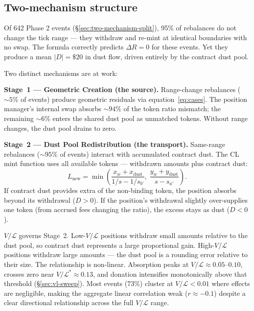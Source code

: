 \documentclass[11pt,a4paper]{article}
\begin{document}
\subsection{Two-mechanism structure}\label{sec:two-mechanism}

Of 642 Phase 2 events (\S\ref{sec:two-mechanism-split}), 95\% of rebalances do not change the tick range --- they withdraw and re-mint at identical boundaries with no swap. The formula correctly predicts $\Delta R = 0$ for these events. Yet they produce a mean $|D| = \$20$ in dust flow, driven entirely by the contract dust pool.

Two distinct mechanisms are at work:

\textbf{Stage~1 --- Geometric Creation (the source).} Range-change rebalances (${\sim}5\%$ of events) produce geometric residuals via equation~\eqref{eq:cases}. The position manager's internal swap absorbs ${\sim}94\%$ of the token ratio mismatch; the remaining ${\sim}6\%$ enters the shared dust pool as unmatched tokens. Without range changes, the dust pool drains to zero.

\textbf{Stage~2 --- Dust Pool Redistribution (the transport).} Same-range rebalances (${\sim}95\%$ of events) interact with accumulated contract dust. The CL mint function uses all available tokens --- withdrawn amounts plus contract dust:
\begin{equation}\label{eq:mint}
L_{\text{new}} = \min\!\left(\frac{x_w + x_{\text{dust}}}{1/s - 1/s_{b'}}, \; \frac{y_w + y_{\text{dust}}}{s - s_{a'}}\right).
\end{equation}
If contract dust provides extra of the non-binding token, the position absorbs beyond its withdrawal ($D > 0$). If the position's withdrawal slightly over-supplies one token (from accrued fees changing the ratio), the excess stays as dust ($D < 0$).

$V/\mathcal{L}$ governs Stage~2. Low-$V/\mathcal{L}$ positions withdraw small amounts relative to the dust pool, so contract dust represents a large proportional gain. High-$V/\mathcal{L}$ positions withdraw large amounts --- the dust pool is a rounding error relative to their size. The relationship is non-linear. Absorption peaks at $V/\mathcal{L} \approx 0.05$--$0.10$, crosses zero near $V/\mathcal{L}^* \approx 0.13$, and donation intensifies monotonically above that threshold (\S\ref{sec:vl-sweep}). Most events ($73\%$) cluster at $V/\mathcal{L} < 0.01$ where effects are negligible, making the aggregate linear correlation weak ($r \approx -0.1$) despite a clear directional relationship across the full $V/\mathcal{L}$ range.
\end{document}
